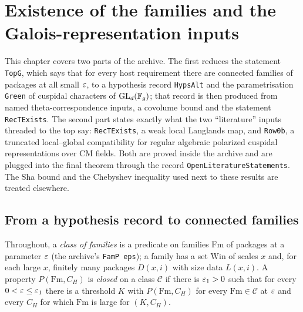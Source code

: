 \chapter{Existence of the families and the Galois-representation inputs}\label{ch:fam}

This chapter covers two parts of the archive. The first reduces the statement \texttt{TopG}, which says that for every host requirement there are connected families of packages at all small $\varepsilon$, to a hypothesis record \texttt{HypsAlt} and the parametrisation \texttt{Green} of cuspidal characters of $\mathrm{GL}_d(\mathbb{F}_g)$; that record is then produced from named theta-correspondence inputs, a covolume bound and the statement \texttt{RecTExists}. The second part states exactly what the two ``literature'' inputs threaded to the top say: \texttt{RecTExists}, a weak local Langlands map, and \texttt{Row0b}, a truncated local--global compatibility for regular algebraic polarized cuspidal representations over CM fields. Both are proved inside the archive and are plugged into the final theorem through the record \texttt{OpenLiteratureStatements}. The Sha bound and the Chebyshev inequality used next to these results are treated elsewhere.

\section{From a hypothesis record to connected families}

Throughout, a \emph{class of families} is a predicate on families $\mathrm{Fm}$ of packages at a parameter $\varepsilon$ (the archive's \texttt{FamP eps}); a family has a set $\mathrm{Win}$ of scales $x$ and, for each large $x$, finitely many packages $D(x,i)$ with size data $L(x,i)$. A property $P(\mathrm{Fm},C_H)$ is \emph{closed} on a class $\mathcal C$ if there is $\varepsilon_1>0$ such that for every $0<\varepsilon\le\varepsilon_1$ there is a threshold $K$ with $P(\mathrm{Fm},C_H)$ for every $\mathrm{Fm}\in\mathcal C$ at $\varepsilon$ and every $C_H$ for which $\mathrm{Fm}$ is large for $(K,C_H)$.





